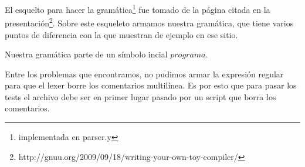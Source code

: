 El esquelto para hacer la gramática\footnote{implementada en parser.y} fue tomado de la página citada en la presentación\footnote{http://gnuu.org/2009/09/18/writing-your-own-toy-compiler/}. Sobre este esqueleto armamos nuestra gramática, que tiene varios puntos de diferencia con la que muestran de ejemplo en ese sitio.

Nuestra gramática parte de un símbolo incial $programa$.



Entre los problemas que encontramos, no pudimos armar la expresión regular para que el lexer borre los comentarios multilínea. Es por esto que para pasar los tests el archivo debe ser en primer lugar pasado por un script que borra los comentarios.